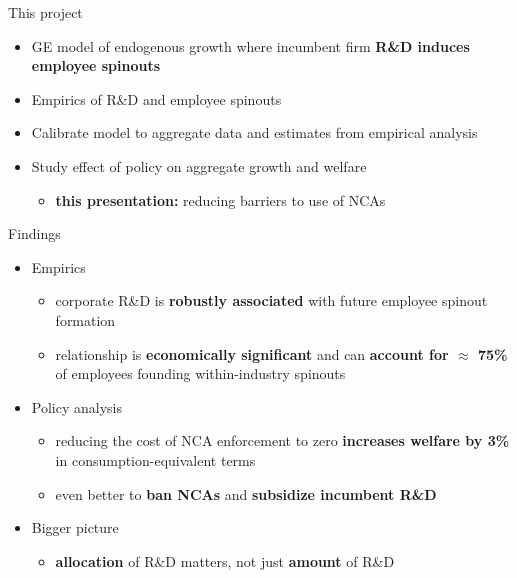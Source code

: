 \documentclass[english,usenames,dvipsnames,handout]{beamer}
\begin{document}
\begin{frame}{This project}
\begin{itemize}
	\item GE model of endogenous growth where incumbent firm \alert{\textbf{R\&D induces employee spinouts}}
	\smallskip
	\item Empirics of R\&D and employee spinouts
	\smallskip
	\item Calibrate model to aggregate data and estimates from empirical analysis
	\smallskip
	\item Study effect of policy on aggregate growth and welfare
	\begin{itemize}
		\item \alert{\textbf{this presentation:}} reducing barriers to use of NCAs
	\end{itemize}
\end{itemize}
\end{frame}

\begin{frame}{Findings}\label{intro_findings}
	\begin{itemize}
		\item<+-> Empirics
		\begin{itemize}
			\item corporate R\&D is \alert{\textbf{robustly associated}} with future employee spinout formation
			\item relationship is \alert{\textbf{economically significant}} and can \alert{\textbf{account for $\approx$ 75\%}} of employees founding within-industry spinouts
		\end{itemize}
		\medskip
		\item<+-> Policy analysis
		\begin{itemize}
			\item reducing the cost of NCA enforcement to zero \alert{\textbf{increases welfare by 3\%}} in consumption-equivalent terms
			\item even better to \alert{\textbf{ban NCAs}} and \alert{\textbf{subsidize incumbent R\&D}} 
		\end{itemize}
		\medskip
		\item<+-> Bigger picture
		\begin{itemize}
			\item \alert{\textbf{allocation}} of R\&D matters, not just \alert{\textbf{amount}} of R\&D
		\end{itemize}
	\end{itemize}
\end{frame}
\end{document}

